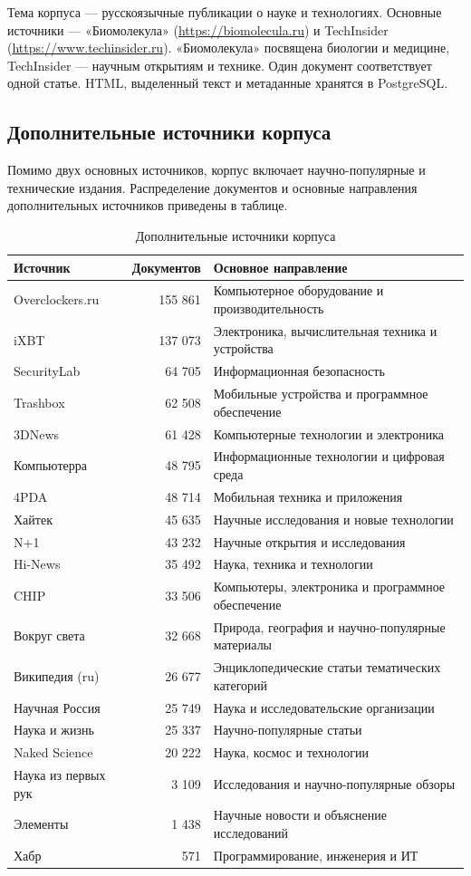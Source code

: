 \documentclass[12pt,a4paper]{article}
\newcommand{\sub}[1]{\subsection{#1}}
\begin{document}
Тема корпуса --- русскоязычные публикации о науке и технологиях. Основные источники --- «Биомолекула» (\url{https://biomolecula.ru}) и TechInsider (\url{https://www.techinsider.ru}). «Биомолекула» посвящена биологии и медицине, TechInsider --- научным открытиям и технике. Один документ соответствует одной статье. HTML, выделенный текст и метаданные хранятся в PostgreSQL.
\sub{Дополнительные источники корпуса}
Помимо двух основных источников, корпус включает научно-популярные и технические издания. Распределение документов и основные направления дополнительных источников приведены в таблице.
\begin{table}[H]\centering\small
\caption{Дополнительные источники корпуса}
\begin{tabularx}{\linewidth}{|l|r|X|}\hline
Источник & Документов & Основное направление \\\hline
Overclockers.ru & 155 861 & Компьютерное оборудование и производительность \\\hline
iXBT & 137 073 & Электроника, вычислительная техника и устройства \\\hline
SecurityLab & 64 705 & Информационная безопасность \\\hline
Trashbox & 62 508 & Мобильные устройства и программное обеспечение \\\hline
3DNews & 61 428 & Компьютерные технологии и электроника \\\hline
Компьютерра & 48 795 & Информационные технологии и цифровая среда \\\hline
4PDA & 48 714 & Мобильная техника и приложения \\\hline
Хайтек & 45 635 & Научные исследования и новые технологии \\\hline
N+1 & 43 232 & Научные открытия и исследования \\\hline
Hi-News & 35 492 & Наука, техника и технологии \\\hline
CHIP & 33 506 & Компьютеры, электроника и программное обеспечение \\\hline
Вокруг света & 32 668 & Природа, география и научно-популярные материалы \\\hline
Википедия (ru) & 26 677 & Энциклопедические статьи тематических категорий \\\hline
Научная Россия & 25 749 & Наука и исследовательские организации \\\hline
Наука и жизнь & 25 337 & Научно-популярные статьи \\\hline
Naked Science & 20 222 & Наука, космос и технологии \\\hline
Наука из первых рук & 3 109 & Исследования и научно-популярные обзоры \\\hline
Элементы & 1 438 & Научные новости и объяснение исследований \\\hline
Хабр & 571 & Программирование, инженерия и ИТ \\\hline
\end{tabularx}\end{table}
\end{document}
